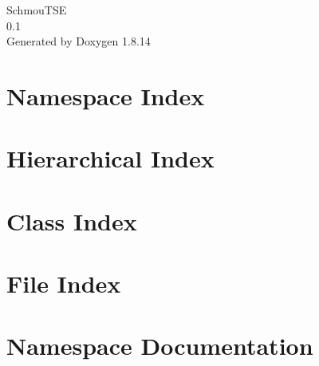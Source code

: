 \documentclass[twoside]{book}
\newcommand{\+}{\discretionary{\mbox{\scriptsize$\hookleftarrow$}}{}{}}
\newcommand{\clearemptydoublepage}{%
  \newpage{\pagestyle{empty}\cleardoublepage}%
}
\begin{document}
\hypersetup{pageanchor=false,
             bookmarksnumbered=true,
             pdfencoding=unicode
            }
\begin{titlepage}
\vspace*{7cm}
\begin{center}%
{\Large Schmou\textquotesingle{}T\+SE \\[1ex]\large 0.\+1 }\\
\vspace*{1cm}
{\large Generated by Doxygen 1.8.14}\\
\end{center}
\end{titlepage}
\clearemptydoublepage
{}
\tableofcontents
\clearemptydoublepage
{}
\hypersetup{pageanchor=true}

\chapter{Namespace Index}

\chapter{Hierarchical Index}

\chapter{Class Index}

\chapter{File Index}

\chapter{Namespace Documentation}



\end{document}
